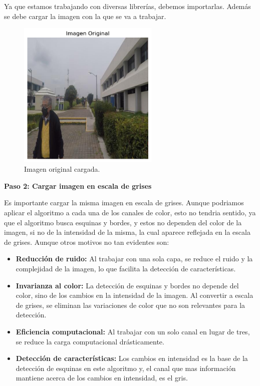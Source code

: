 \documentclass[a4paper]{article}
\begin{document}
Ya que estamos trabajando con diversas librerías, debemos importarlas.
Además se debe cargar la imagen con la que se va a trabajar.

\begin{figure}[H]
    \centering
    \includegraphics[width=0.6\textwidth]{images/harris_paso_1.png}
    \caption{Imagen original cargada.}
\end{figure}

\par\vspace{0.5cm}
\textbf{Paso 2: Cargar imagen en escala de grises}
\par\vspace{0.5cm}

Es importante cargar la misma imagen en escala de grises. Aunque podriamos aplicar el algoritmo a cada una de los canales de color,
esto no tendria sentido, ya que el algoritmo busca esquinas y bordes, y estos no dependen del color de la imagen, si no de la intensidad de la misma, la cual aparece reflejada en la escala de grises. 
Aunque otros motivos no tan evidentes son:

\begin{itemize}
    \item \textbf{Reducción de ruido:} Al trabajar con una sola capa, se reduce el ruido y la complejidad de la imagen, lo que facilita la detección de características.
    \item \textbf{Invarianza al color:} La detección de esquinas y bordes no depende del color, sino de los cambios en la intensidad de la imagen. Al convertir a escala de grises, se eliminan las variaciones de color que no son relevantes para la detección.
    \item \textbf{Eficiencia computacional:} Al trabajar con un solo canal en lugar de tres, se reduce la carga computacional drásticamente.
    \item \textbf{Detección de características:} Los cambios en intensidad es la base de la detección de esquinas en este algoritmo y, el canal que mas información mantiene acerca de los cambios en intensidad, es el gris.
\end{itemize}
\end{document}

